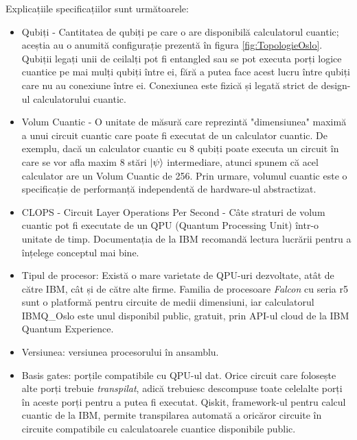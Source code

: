 Explicațiile specificațiilor sunt următoarele:
\begin{itemize}
    \item Qubiți - Cantitatea de qubiți pe care o are disponibilă calculatorul cuantic; aceștia au o anumită configurație prezentă în figura \ref{fig:TopologieOslo}. Qubiții legați unii de ceilalți pot fi entangled sau se pot executa porți logice cuantice pe mai mulți qubiți între ei, fără a putea face acest lucru între qubiți care nu au conexiune între ei. Conexiunea este fizică și legată strict de design-ul calculatorului cuantic.
    \item Volum Cuantic - O unitate de măsură care reprezintă "dimensiunea" maximă a unui circuit cuantic care poate fi executat de un calculator cuantic. De exemplu, dacă un calculator cuantic cu 8 qubiți poate executa un circuit în care se vor afla maxim 8 stări $\ket{\psi}$ intermediare, atunci spunem că acel calculator are un Volum Cuantic de 256. Prin urmare, volumul cuantic este o specificație de performanță independentă de hardware-ul abstractizat.
    \item CLOPS - Circuit Layer Operations Per Second - Câte straturi de volum cuantic pot fi executate de un QPU (Quantum Processing Unit) într-o unitate de timp. Documentația de la IBM \cite{misc:web:DocumentatieIBMQ} recomandă lectura lucrării \cite{misc:paper:QSS:WackAndrewEtAl} pentru a înțelege conceptul mai bine.
    \item Tipul de procesor: Există o mare varietate de QPU-uri dezvoltate, atât de către IBM, cât și de către alte firme. Familia de procesoare \textit{Falcon} cu seria r5 sunt o platformă pentru circuite de medii dimensiuni, iar calculatorul IBMQ\_Oslo este unul disponibil public, gratuit, prin API-ul cloud de la IBM Quantum Experience.
    \item Versiunea: versiunea procesorului în ansamblu.
    \item Basis gates: porțile compatibile cu QPU-ul dat. Orice circuit care folosește alte porți trebuie \textit{transpilat}, adică trebuiesc descompuse toate celelalte porți în aceste porți pentru a putea fi executat. Qiskit, framework-ul pentru calcul cuantic de la IBM, permite transpilarea automată a oricăror circuite în circuite compatibile cu calculatoarele cuantice disponibile public.
\end{itemize}

